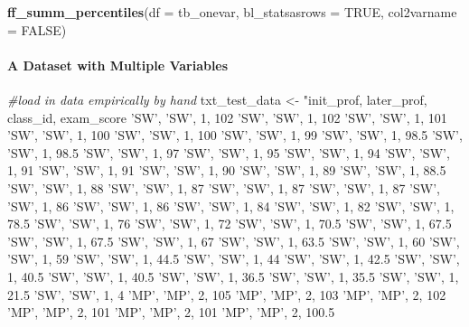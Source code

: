 \documentclass[
]{book}
\newenvironment{Shaded}{\begin{snugshade}}{\end{snugshade}}
\newcommand{\CommentTok}[1]{\textcolor[rgb]{0.56,0.35,0.01}{\textit{#1}}}
\newcommand{\DataTypeTok}[1]{\textcolor[rgb]{0.13,0.29,0.53}{#1}}
\newcommand{\KeywordTok}[1]{\textcolor[rgb]{0.13,0.29,0.53}{\textbf{#1}}}
\newcommand{\NormalTok}[1]{#1}
\newcommand{\OtherTok}[1]{\textcolor[rgb]{0.56,0.35,0.01}{#1}}
\newcommand{\StringTok}[1]{\textcolor[rgb]{0.31,0.60,0.02}{#1}}
\begin{document}
\begin{Shaded}
\begin{Highlighting}[]
\KeywordTok{ff_summ_percentiles}\NormalTok{(}\DataTypeTok{df =}\NormalTok{ tb_onevar, }\DataTypeTok{bl_statsasrows =} \OtherTok{TRUE}\NormalTok{, }\DataTypeTok{col2varname =} \OtherTok{FALSE}\NormalTok{)}
\end{Highlighting}
\end{Shaded}

\hypertarget{a-dataset-with-multiple-variables}{%
\paragraph{A Dataset with Multiple Variables}\label{a-dataset-with-multiple-variables}}

\begin{Shaded}
\begin{Highlighting}[]
\CommentTok{#load in data empirically by hand}
\NormalTok{txt_test_data <-}\StringTok{ "init_prof, later_prof, class_id, exam_score}
\StringTok{ 'SW', 'SW', 1, 102}
\StringTok{ 'SW', 'SW', 1, 102}
\StringTok{ 'SW', 'SW', 1, 101}
\StringTok{ 'SW', 'SW', 1, 100}
\StringTok{ 'SW', 'SW', 1, 100}
\StringTok{ 'SW', 'SW', 1, 99}
\StringTok{ 'SW', 'SW', 1, 98.5}
\StringTok{ 'SW', 'SW', 1, 98.5}
\StringTok{ 'SW', 'SW', 1, 97}
\StringTok{ 'SW', 'SW', 1, 95}
\StringTok{ 'SW', 'SW', 1, 94}
\StringTok{ 'SW', 'SW', 1, 91}
\StringTok{ 'SW', 'SW', 1, 91}
\StringTok{ 'SW', 'SW', 1, 90}
\StringTok{ 'SW', 'SW', 1, 89}
\StringTok{ 'SW', 'SW', 1, 88.5}
\StringTok{ 'SW', 'SW', 1, 88}
\StringTok{ 'SW', 'SW', 1, 87}
\StringTok{ 'SW', 'SW', 1, 87}
\StringTok{ 'SW', 'SW', 1, 87}
\StringTok{ 'SW', 'SW', 1, 86}
\StringTok{ 'SW', 'SW', 1, 86}
\StringTok{ 'SW', 'SW', 1, 84}
\StringTok{ 'SW', 'SW', 1, 82}
\StringTok{ 'SW', 'SW', 1, 78.5}
\StringTok{ 'SW', 'SW', 1, 76}
\StringTok{ 'SW', 'SW', 1, 72}
\StringTok{ 'SW', 'SW', 1, 70.5}
\StringTok{ 'SW', 'SW', 1, 67.5}
\StringTok{ 'SW', 'SW', 1, 67.5}
\StringTok{ 'SW', 'SW', 1, 67}
\StringTok{ 'SW', 'SW', 1, 63.5}
\StringTok{ 'SW', 'SW', 1, 60}
\StringTok{ 'SW', 'SW', 1, 59}
\StringTok{ 'SW', 'SW', 1, 44.5}
\StringTok{ 'SW', 'SW', 1, 44}
\StringTok{ 'SW', 'SW', 1, 42.5}
\StringTok{ 'SW', 'SW', 1, 40.5}
\StringTok{ 'SW', 'SW', 1, 40.5}
\StringTok{ 'SW', 'SW', 1, 36.5}
\StringTok{ 'SW', 'SW', 1, 35.5}
\StringTok{ 'SW', 'SW', 1, 21.5}
\StringTok{ 'SW', 'SW', 1, 4}
\StringTok{ 'MP', 'MP', 2, 105}
\StringTok{ 'MP', 'MP', 2, 103}
\StringTok{ 'MP', 'MP', 2, 102}
\StringTok{ 'MP', 'MP', 2, 101}
\StringTok{ 'MP', 'MP', 2, 101}
\StringTok{ 'MP', 'MP', 2, 100.5}

\end{Highlighting}
\end{Shaded}
\end{document}
